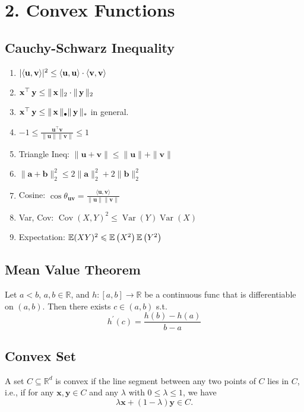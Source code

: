 \section*{2. Convex Functions}
\subsection*{Cauchy-Schwarz Inequality}
\begin{enumerate}[label = (\arabic*), leftmargin=*]
    \item $|\langle\boldsymbol{\mathbf{u}}, \mathbf{v}\rangle|^{2} \leq\langle\mathbf{u}, \mathbf{u}\rangle \cdot\langle\mathbf{v}, \mathbf{v}\rangle$
    \item $\operatorname{\boldsymbol{\mathbf{x}}}^\top \operatorname{\boldsymbol{\mathbf{y}}} \leq \|\operatorname{\boldsymbol{\mathbf{x}}}\|_2 \cdot \|\operatorname{\boldsymbol{\mathbf{y}}}\|_2$
    \item $\operatorname{\boldsymbol{\mathbf{x}}}^\top \operatorname{\boldsymbol{\mathbf{y}}} \leq \|\operatorname{\boldsymbol{\mathbf{x}}}\|_{\bullet} \|\operatorname{\boldsymbol{\mathbf{y}}}\|_*$ in general.
    \item $-1 \leq \frac{\mathbf{u}^{\top} \mathbf{v}}{\|\mathbf{u}\|\|\mathbf{v}\|} \leq 1$
    \item Triangle Ineq: $\|\mathbf{u}+\mathbf{v}\| \leq\|\mathbf{u}\|+\|\mathbf{v}\|$
    \item $\|\mathbf{a}+\mathbf{b}\|_{2}^{2} \leqslant 2\|\mathbf{a}\|_{2}^{2}+2\|\mathbf{b}\|_{2}^{2}$
    \item Cosine: $\cos \theta_{\mathbf{u v}}=\frac{\langle\mathbf{u}, \mathbf{v}\rangle}{\|\mathbf{u}\|\|\mathbf{v}\|}$
    \item Var, Cov: $\operatorname{Cov}(X, Y)^{2} \leqslant \operatorname{Var}(Y) \operatorname{Var}(X)$
    \item Expectation: $\operatorname{\mathbb{E}} (X Y)^{2} \leqslant \operatorname{\mathbb{E}}\left(X^{2}\right) \operatorname{\mathbb{E}} \left(Y^{2}\right)$
\end{enumerate}



\subsection*{Mean Value Theorem}
Let $a<b$, $a, b \in \mathbb{R}$, and $h:[a, b] \rightarrow \mathbb{R}$ be a continuous func that is differentiable on $(a, b)$. Then there exists $c \in(a, b)$ s.t.
$$
h^{\prime}(c)=\frac{h(b)-h(a)}{b-a}
$$

\subsection*{Convex Set}
A set $C \subseteq \mathbb{R}^{d}$ is convex if the line segment between any two points of $C$ lies in $C$, i.e., if for any $\mathbf{x}, \mathbf{y} \in C$ and any $\lambda$ with $0 \leq \lambda \leq 1$, we have
$$
\lambda \mathbf{x}+(1-\lambda) \mathbf{y} \in C .
$$
